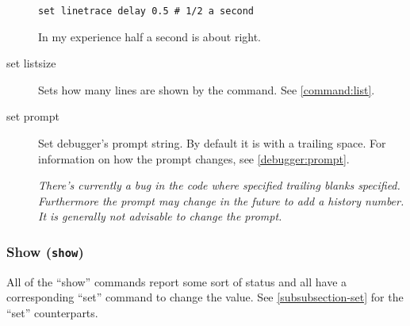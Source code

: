 \begin{description}
\begin{verbatim}
set linetrace delay 0.5 # 1/2 a second
\end{verbatim}

In my experience half a second is about right.

\item[set listsize \var{lines}]\label{command:listsize}

Sets how many lines are shown by the  command. See
\ref{command:list}.

\item[set prompt \var{prompt-string}]\label{command:prompt}

Set debugger's prompt string. By default it is  with
a trailing space. For information on how the prompt
changes, see \ref{debugger:prompt}.

\emph{There's currently a bug in the code where specified trailing
blanks specified. Furthermore the prompt may change in the future to
add a history number. It is generally not advisable to change the
prompt.}

\end{description}

\subsubsection{Show ({\tt show}) \label{subsubsection-show}}

All of the ``show'' commands report some sort of status and all have a
corresponding ``set'' command to change the value. See
\ref{subsubsection-set} for the ``set'' counterparts.

